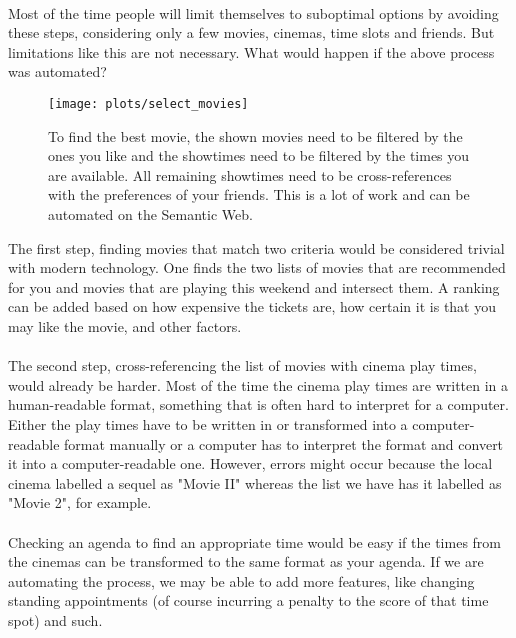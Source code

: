\documentclass{article}
\begin{document}
 \paragraph{}
 Most of the time people will limit themselves to suboptimal options by avoiding these steps, considering only a few movies, cinemas, time slots and friends. But limitations like this are not necessary. What would happen if the above process was automated? 
 
 \begin{figure}
 \centering
 \texttt{[image: plots/select\_movies]}
 \caption{To find the best movie, the shown movies need to be filtered by the ones you like and the showtimes need to be filtered by the times you are available. All remaining showtimes need to be cross-references with the preferences of your friends. This is a lot of work and can be automated on the Semantic Web.}
 \label{movies}
 \end{figure}
 
The first step, finding movies that match two criteria would be considered trivial with modern technology. One finds the two lists of movies that are recommended for you and movies that are playing this weekend and intersect them. A ranking can be added based on how expensive the tickets are, how certain it is that you may like the movie, and other factors. 
 \paragraph{}
 The second step, cross-referencing the list of movies with cinema play times, would already be harder. Most of the time the cinema play times are written in a human-readable format, something that is often hard to interpret for a computer. Either the play times have to be written in or transformed into a computer-readable format manually or a computer has to interpret the format and convert it into a computer-readable one. However, errors might occur because the local cinema labelled a sequel as "Movie II" whereas the list we have has it labelled as "Movie 2", for example.
 \paragraph{}
 Checking an agenda to find an appropriate time would be easy if the times from the cinemas can be transformed to the same format as your agenda. If we are automating the process, we may be able to add more features, like changing standing appointments (of course incurring a penalty to the score of that time spot) and such.
\end{document}
